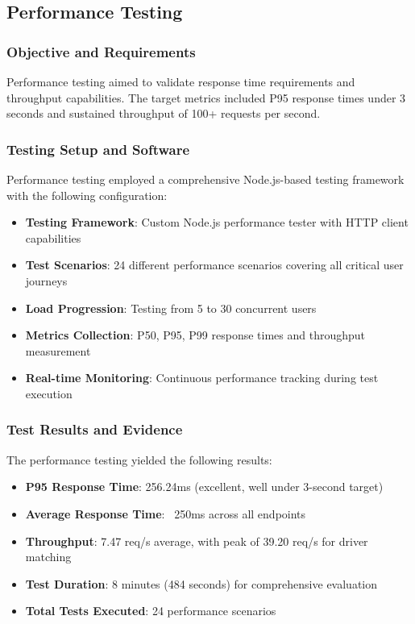 \documentclass[12pt]{article}
\begin{document}
\subsection{Performance Testing}

\subsubsection{Objective and Requirements}
Performance testing aimed to validate response time requirements and throughput capabilities. The target metrics included P95 response times under 3 seconds and sustained throughput of 100+ requests per second.

\subsubsection{Testing Setup and Software}
Performance testing employed a comprehensive Node.js-based testing framework with the following configuration:
\begin{itemize}
    \item \textbf{Testing Framework}: Custom Node.js performance tester with HTTP client capabilities
    \item \textbf{Test Scenarios}: 24 different performance scenarios covering all critical user journeys
    \item \textbf{Load Progression}: Testing from 5 to 30 concurrent users
    \item \textbf{Metrics Collection}: P50, P95, P99 response times and throughput measurement
    \item \textbf{Real-time Monitoring}: Continuous performance tracking during test execution
\end{itemize}

\subsubsection{Test Results and Evidence}

The performance testing yielded the following results:
\begin{itemize}
    \item \textbf{P95 Response Time}: 256.24ms (excellent, well under 3-second target)
    \item \textbf{Average Response Time}: ~250ms across all endpoints
    \item \textbf{Throughput}: 7.47 req/s average, with peak of 39.20 req/s for driver matching
    \item \textbf{Test Duration}: 8 minutes (484 seconds) for comprehensive evaluation
    \item \textbf{Total Tests Executed}: 24 performance scenarios
\end{itemize}
\end{document}
